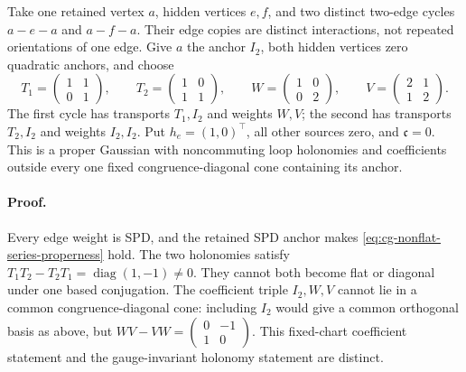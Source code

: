 Take one retained vertex \(a\), hidden vertices \(e,f\), and two
distinct two-edge cycles \(a-e-a\) and \(a-f-a\). Their edge
copies are distinct interactions, not repeated orientations of
one edge. Give \(a\) the anchor \(I_2\), both hidden vertices zero
quadratic anchors, and choose
\begin{equation}
T_1=\begin{pmatrix}1&1\\0&1\end{pmatrix},\qquad
T_2=\begin{pmatrix}1&0\\1&1\end{pmatrix},\qquad
W=\begin{pmatrix}1&0\\0&2\end{pmatrix},\qquad
V=\begin{pmatrix}2&1\\1&2\end{pmatrix}.
\label{eq:cg-nonflat-series-example-data}
\end{equation}
The first cycle has transports \(T_1,I_2\) and weights \(W,V\);
the second has transports \(T_2,I_2\) and weights \(I_2,I_2\).
Put \(h_e=(1,0)^\top\), all other sources zero, and
\(\mathfrak c=0\). This is a proper Gaussian with noncommuting
loop holonomies and coefficients outside every one fixed
congruence-diagonal cone containing its anchor.

\paragraph{Proof.}
Every edge weight is SPD, and the retained SPD anchor makes
\eqref{eq:cg-nonflat-series-properness} hold. The two holonomies
satisfy \(T_1T_2-T_2T_1=\operatorname{diag}(1,-1)\ne0\).
They cannot both become flat or diagonal under one based
conjugation. The coefficient triple \(I_2,W,V\) cannot lie in
a common congruence-diagonal cone: including \(I_2\) would give
a common orthogonal basis as above, but
\(WV-VW=\left(\begin{smallmatrix}0&-1\\1&0\end{smallmatrix}\right)\).
This fixed-chart coefficient statement and the gauge-invariant
holonomy statement are distinct.

